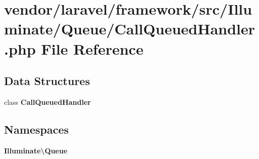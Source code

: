 \section{vendor/laravel/framework/src/\+Illuminate/\+Queue/\+Call\+Queued\+Handler.php File Reference}
\label{_queue_2_call_queued_handler_8php}
\subsection*{Data Structures}
\begin{DoxyCompactItemize}
\item 
class {\bf Call\+Queued\+Handler}
\end{DoxyCompactItemize}
\subsection*{Namespaces}
\begin{DoxyCompactItemize}
\item 
 {\bf Illuminate\textbackslash{}\+Queue}
\end{DoxyCompactItemize}
